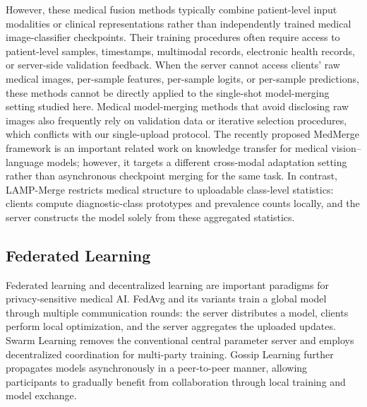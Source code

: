\documentclass[letterpaper]{article} %
\begin{document}
However, these medical fusion methods typically combine patient-level input modalities or clinical representations rather than independently trained medical image-classifier checkpoints. Their training procedures often require access to patient-level samples, timestamps, multimodal records, electronic health records, or server-side validation feedback. When the server cannot access clients’ raw medical images, per-sample features, per-sample logits, or per-sample predictions, these methods cannot be directly applied to the single-shot model-merging setting studied here. Medical model-merging methods that avoid disclosing raw images also frequently rely on validation data or iterative selection procedures, which conflicts with our single-upload protocol. The recently proposed MedMerge framework is an important related work on knowledge transfer for medical vision–language models\cite{11382027}; however, it targets a different cross-modal adaptation setting rather than asynchronous checkpoint merging for the same task. In contrast, LAMP-Merge restricts medical structure to uploadable class-level statistics: clients compute diagnostic-class prototypes and prevalence counts locally, and the server constructs the model solely from these aggregated statistics.

\subsection{Federated Learning}

Federated learning and decentralized learning are important paradigms for privacy-sensitive medical AI\cite{kaissis_secure_2020}. FedAvg and its variants train a global model through multiple communication rounds\cite{pmlr-v54-mcmahan17a}: the server distributes a model, clients perform local optimization, and the server aggregates the uploaded updates. Swarm Learning removes the conventional central parameter server and employs decentralized coordination for multi-party training\cite{warnat-herresthal_swarm_2021}. Gossip Learning further propagates models asynchronously in a peer-to-peer manner, allowing participants to gradually benefit from collaboration through local training and model exchange\cite{hegedhus_gossip_2019}.
\end{document}
